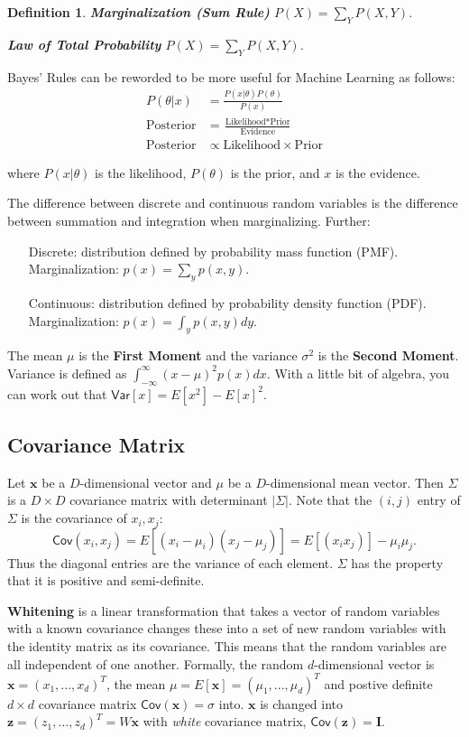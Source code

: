 \documentclass[twoside]{article}
\newtheorem{definition}[theorem]{Definition}
\newcommand\x{\mathbf{x}}
\newcommand\I{\mathbf{I}}
\newcommand\Var{\mathsf{Var}}
\newcommand\Cov{\mathsf{Cov}}
\newcommand\z{\mathbf{z}}
\begin{document}
\begin{definition}
\textbf{Marginalization (Sum Rule)} $P(X) = \sum_{Y} P(X, Y)$. 

\textbf{Law of Total Probability} $P(X) = \sum_{Y} P(X, Y)$.
\end{definition}

Bayes' Rules can be reworded to be more useful for Machine Learning as follows:
\begin{align*}
P(\theta | x) &= \frac{P(x|\theta)P(\theta)}{P(x)} \\
\mbox{Posterior} &= \frac{\mbox{Likelihood}*\mbox{Prior}}{\mbox{Evidence}} \\
\mbox{Posterior} &\propto \mbox{Likelihood} \times \mbox{Prior}
\end{align*}

where $P(x|\theta)$ is the likelihood, $P(\theta)$ is the prior, and $x$ is the evidence.

The difference between discrete and continuous random variables is the difference between summation and integration when marginalizing. Further:
\begin{enumerate}
\item[Discrete:] distribution defined by probability mass function (PMF). Marginalization: $p(x) = \sum_{y} p(x,y)$.
\item[Continuous:] distribution defined by probability density function (PDF). Marginalization: $p(x) = \int_{y}p(x,y) dy$.
\end{enumerate}

The mean $\mu$ is the \textbf{First Moment} and the variance $\sigma^2$ is the \textbf{Second Moment}. Variance is defined as $\int_{-\infty}^{\infty} (x - \mu)^2 p(x) dx$. With a little bit of algebra, you can work out that $\Var[x] = E[x^2] - E[x]^2$.

\subsection{Covariance Matrix}
Let $\x$ be a $D$-dimensional vector and $\mu$ be a $D$-dimensional mean vector. Then $\Sigma$ is a $D\times D$ covariance matrix with determinant $|\Sigma |$. Note that the $(i,j)$ entry of $\Sigma$ is the covariance of $x_i, x_j$: 
\[\Cov(x_i, x_j) = E[(x_i - \mu_i)(x_j - \mu_j)] = E[(x_ix_j)] - \mu_i\mu_j.\]
Thus the diagonal entries are the variance of each element. $\Sigma$ has the property that it is positive and semi-definite. 

\textbf{Whitening} is a linear transformation that takes a vector of random variables with a known covariance changes these into a set of new random variables with the identity matrix as its covariance. This means that the random variables are all independent of one another. Formally, the random $d$-dimensional vector is $\x  = (x_1, ..., x_d)^T$, the mean $\mu = E[\x] = (\mu_1, ..., \mu_d)^T$ and postive definite $d \times d$ covariance matrix $\Cov(\x) = \sigma$ into. $\x$ is changed into $\z = (z_1, ..., z_d)^T = W\x$ with \emph{white} covariance matrix, $\Cov(\z) = \I$. 
\end{document}

